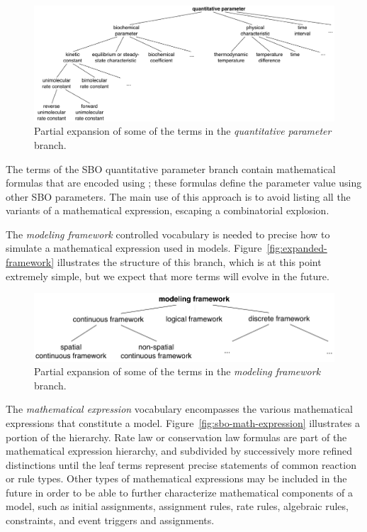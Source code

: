 \begin{figure}[tbh]
  \centering
  \includegraphics[scale = 0.85]{figs/sbo-quantitative-parameter}
  \caption{Partial expansion of some of the terms in the
    \emph{quantitative parameter} branch.}
  \label{fig:expanded-parameter}
\end{figure}

The terms of the SBO quantitative parameter branch contain
mathematical formulas that are encoded using \mathmltwo; these
formulas define the parameter value using other SBO parameters.
The main use of this approach is to avoid listing all the variants
of a mathematical expression, escaping a combinatorial explosion.

The \emph{modeling framework} controlled vocabulary is needed to
precise how to simulate a mathematical expression used in models.
Figure~\vref{fig:expanded-framework} illustrates the structure of
this branch, which is at this point extremely simple, but we
expect that more terms will evolve in the future.

\begin{figure}[tbh]
  \centering
  \vspace*{1ex}
  \includegraphics[scale = 0.8]{figs/sbo-framework}
  \caption{Partial expansion of some of the terms in the
    \emph{modeling framework} branch.}
  \label{fig:expanded-framework}
\end{figure}

The \emph{mathematical expression} vocabulary encompasses the
various mathematical expressions that constitute a model.
Figure~\vref{fig:sbo-math-expression} illustrates a portion of the
hierarchy.  Rate law or conservation law formulas are part of the
mathematical expression hierarchy, and subdivided by successively
more refined distinctions until the leaf terms represent precise
statements of common reaction or rule types.  Other types of
mathematical expressions may be included in the future in order to
be able to further characterize mathematical components of a
model, such as initial assignments, assignment rules, rate rules,
algebraic rules, constraints, and event triggers and assignments.

